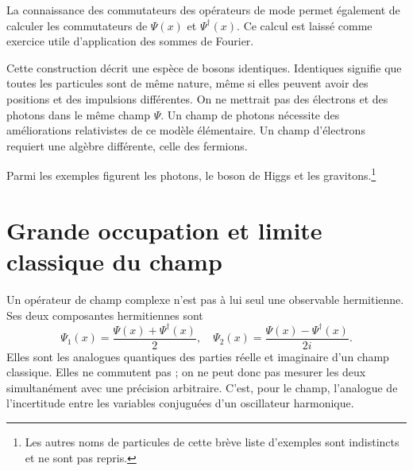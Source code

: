 La connaissance des commutateurs des opérateurs de mode permet également de calculer les commutateurs de \(\Psi(x)\) et \(\Psi^\dagger(x)\). Ce calcul est laissé comme exercice utile d’application des sommes de Fourier.

Cette construction décrit une espèce de bosons identiques. Identiques signifie que toutes les particules sont de même nature, même si elles peuvent avoir des positions et des impulsions différentes. On ne mettrait pas des électrons et des photons dans le même champ \(\Psi\). Un champ de photons nécessite des améliorations relativistes de ce modèle élémentaire. Un champ d’électrons requiert une algèbre différente, celle des fermions.

\begin{classroomqa}\end{classroomqa}


Parmi les exemples figurent les photons, le boson de Higgs et les gravitons.\footnote{Les autres noms de particules de cette brève liste d’exemples sont indistincts et ne sont pas repris.}

\section{Grande occupation et limite classique du champ}

Un opérateur de champ complexe n’est pas à lui seul une observable hermitienne. Ses deux composantes hermitiennes sont
\begin{equation}
\Psi_1(x)=\frac{\Psi(x)+\Psi^\dagger(x)}{2},
\quad
\Psi_2(x)=\frac{\Psi(x)-\Psi^\dagger(x)}{2i}.
\end{equation}
Elles sont les analogues quantiques des parties réelle et imaginaire d’un champ classique. Elles ne commutent pas ; on ne peut donc pas mesurer les deux simultanément avec une précision arbitraire. C’est, pour le champ, l’analogue de l’incertitude entre les variables conjuguées d’un oscillateur harmonique.

